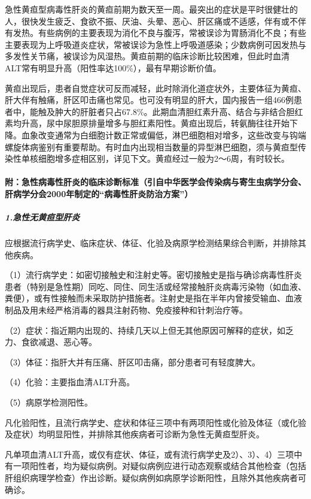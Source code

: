 急性黄疸型病毒性肝炎的黄疸前期为数天至一周。最突出的症状是平时很健壮的人，很快发生疲乏、食欲不振、厌油、头晕、恶心、肝区痛或不适感，伴有或不伴有发热。有些病例的主要表现为消化不良与腹泻，常被误诊为胃肠消化不良；有些主要表现为上呼吸道炎症状，常被误诊为急性上呼吸道感染；少数病例可因发热与多发性关节痛，被误诊为风湿热。黄疸前期的临床诊断比较困难，但此时血清ALT常有明显升高（阳性率达100\%），最有早期诊断价值。

黄疸出现后，患者自觉症状可反而减轻，此时除消化道症状外，主要体征为黄疸、肝大伴有触痛，肝区叩击痛也常见。也可没有明显的肝大，国内报告一组466例患者中，能触及肿大的肝脏者只占67.8\%。此期血清胆红素升高、结合与非结合胆红素均升高，尿中尿胆原排量增多与胆红素阳性。黄疸出现后，转氨酶往往开始下降。血象改变通常为白细胞计数正常或偏低，淋巴细胞相对增多，这些改变与钩端螺旋体病鉴别有重要帮助。有时血内出现相当数量的异型淋巴细胞，须与黄疸型传染性单核细胞增多症相区别，详见下文。黄疸经过一般为2～6周，有时较长。

\paragraph{附：急性病毒性肝炎的临床诊断标准（引自中华医学会传染病与寄生虫病学分会、肝病学分会2000年制定的“病毒性肝炎防治方案”）}

\subparagraph{1.急性无黄疸型肝炎}

应根据流行病学史、临床症状、体征、化验及病原学检测结果综合判断，并排除其他疾病。

（1）流行病学史：如密切接触史和注射史等。密切接触史是指与确诊病毒性肝炎患者（特别是急性期）同吃、同住、同生活或经常接触肝炎病毒污染物（如血液、粪便），或有性接触而未采取防护措施者。注射史是指在半年内曾接受输血、血液制品及用未经严格消毒的器具注射药物、免疫接种和针刺治疗等。

（2）症状：指近期内出现的、持续几天以上但无其他原因可解释的症状，如乏力、食欲减退、恶心等。

（3）体征：指肝大并有压痛、肝区叩击痛，部分患者可有轻度脾大。

（4）化验：主要指血清ALT升高。

（5）病原学检测阳性。

凡化验阳性，且流行病学史、症状和体征三项中有两项阳性或化验及体征（或化验及症状）均明显阳性，并排除其他疾病者可诊断为急性无黄疸型肝炎。

凡单项血清ALT升高，或仅有症状、体征，或有流行病学史及2）、3）、4）三项中有一项阳性者，均为疑似病例。对疑似病例应进行动态观察或结合其他检查（包括肝组织病理学检查）作出诊断。疑似病例如病原学诊断阳性，且除外其他疾病者可确诊。

